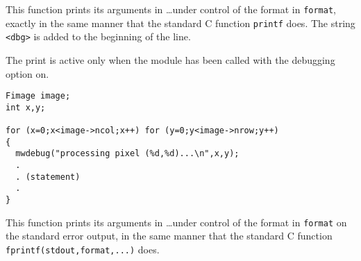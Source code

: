 \newpage %

\Description
This function prints its arguments in \ldots under control of the format in \verb+format+, exactly in the same manner that the standard C function \verb+printf+ does. 
The string \verb+<dbg>+ is added to the beginning of the line.

The print is active only when the module has been called with the debugging option on.

\Next
\Example
\begin{verbatim}
Fimage image; 
int x,y;

for (x=0;x<image->ncol;x++) for (y=0;y<image->nrow;y++)
{
  mwdebug("processing pixel (%d,%d)...\n",x,y);
  .
  . (statement)
  .
}
\end{verbatim}

\newpage %

\Description
This function prints its arguments in \ldots under control of the format in \verb+format+ on the standard error output, in the same manner that the standard C function \verb+fprintf(stdout,format,...)+ does. 

